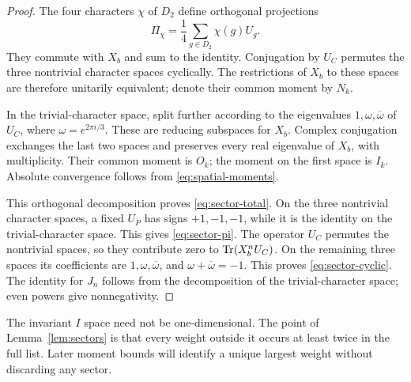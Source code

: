 \begin{proof}
The four characters $\chi$ of $D_2$ define orthogonal projections
\[
 \Pi_\chi=\frac14\sum_{g\in D_2}\chi(g)U_g.
\]
They commute with $X_b$ and sum to the identity. Conjugation by $U_C$
permutes the three nontrivial character spaces cyclically. The
restrictions of $X_b$ to these spaces are therefore unitarily equivalent;
denote their common moment by $N_k$.

In the trivial-character space, split further according to the
eigenvalues $1,\omega,\overline\omega$ of $U_C$, where
$\omega=e^{2\pi i/3}$. These are reducing subspaces for $X_b$. Complex
conjugation exchanges the last two spaces and preserves every real
eigenvalue of $X_b$, with multiplicity. Their common moment is $O_k$;
the moment on the first space is $I_k$. Absolute convergence follows
from \eqref{eq:spatial-moments}.

This orthogonal decomposition proves \eqref{eq:sector-total}. On the
three nontrivial character spaces, a fixed $U_P$ has signs $+1,-1,-1$,
while it is the identity on the trivial-character space. This gives
\eqref{eq:sector-pi}. The operator $U_C$ permutes the nontrivial spaces,
so they contribute zero to $\operatorname{Tr}(X_b^nU_C)$. On the remaining three
spaces its coefficients are $1,\omega,\overline\omega$, and
$\omega+\overline\omega=-1$. This proves
\eqref{eq:sector-cyclic}. The identity for $J_n$ follows from the
decomposition of the trivial-character space; even powers give nonnegativity.
\end{proof}

The invariant $I$ space need not be one-dimensional. The point of
Lemma~\ref{lem:sectors} is that every weight outside it occurs at least
twice in the full list. Later moment bounds will identify a unique
largest weight without discarding any sector.
